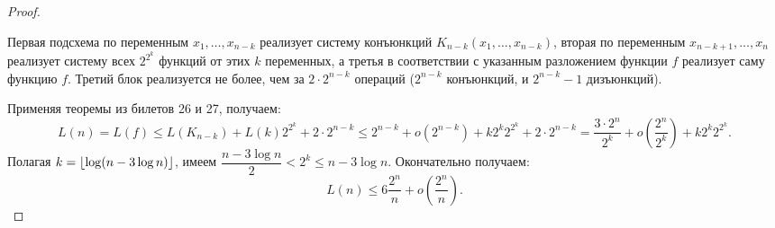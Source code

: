 \begin{proof}
\begin{center}
    \end{center}
     Первая подсхема по переменным $x_1, \ldots, x_{n-k}$ реализует систему конъюнкций $K_{n-k}(x_1, \ldots, x_{n-k})$, вторая по переменным $x_{n-k+1}, \ldots, x_n$ реализует систему всех $2^{2^k}$ функций от этих $k$ переменных, а третья в соответствии с указанным разложением функции $f$ реализует саму функцию $f$. Третий блок реализуется не более, чем за $2\cdot 2^{n-k}$ операций ($2^{n-k}$ конъюнкций, и $2^{n-k}-1$ дизъюнкций).

     Применяя теоремы из билетов 26 и 27, получаем:
     \[
        L(n) = L(f) \leqslant L(K_{n-k}) + L(k)2^{2^k} + 2\cdot 2^{n-k} \leqslant 2^{n-k} + o(2^{n-k}) + k2^k2^{2^k} + 2\cdot 2^{n-k} = \frac{3\cdot 2^n}{2^k} + o\left(\frac{2^n}{2^k}\right) + k2^k2^{2^k}.
     \]
     Полагая $k = \left\lfloor \log(n-3\log n) \right\rfloor$, имеем $\dfrac{n-3\log n}{2} < 2^k \leqslant n-3\log n$.
     Окончательно получаем:
     \[
        L(n) \leqslant 6 \frac{2^n}{n} + o\left(\frac{2^n}{n}\right).
     \]
\end{proof}